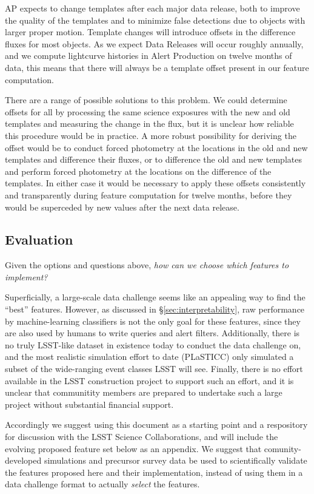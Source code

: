 \documentclass[DM,authoryear,toc]{lsstdoc}
\begin{document}
AP expects to change templates after each major data release, both to improve the quality of the templates and to minimize false detections due to objects with larger proper motion.
Template changes will introduce offsets in the difference fluxes for most objects.
As we expect Data Releases will occur roughly annually, and we compute lightcurve histories in Alert Production on twelve months of data, this means that there will always be a template offset present in our feature computation.

There are a range of possible solutions to this problem. 
We could determine offsets for all \DIAObjects by processing the same science exposures with the new and old templates and measuring the change in the \DIASource flux, but it is unclear how reliable this procedure would be in practice.
A more robust possibility for deriving the offset would be to conduct forced photometry at the \DIAObject locations in the old and new templates and difference their fluxes, or to difference the old and new templates and perform forced photometry at the \DIAObject locations on the difference of the templates.
In either case it would be necessary to apply these offsets consistently and transparently during feature computation for twelve months, before they would be superceded by new values after the next data release.  


\subsection{Evaluation}

Given the options and questions above, 
\textit{how can we choose which features to implement?}

Superficially, a large-scale data challenge seems like an appealing way to find the ``best'' features.
However, as discussed in \S \ref{sec:interpretability}, raw performance by machine-learning classifiers is not the only goal for these features, since they are also used by humans to write queries and alert filters.
Additionally, there is no truly LSST-like dataset in existence today to conduct the data challenge on, and the most realistic simulation effort to date (PLaSTICC) only simulated a subset of the wide-ranging event classes LSST will see.
Finally, there is no effort available in the LSST construction project to support such an effort, and it is unclear that communitity members are prepared to undertake such a large project without substantial financial support.

Accordingly we suggest using this document as a starting point and a respository for discussion with the LSST Science Collaborations, and will include the evolving proposed feature set below as an appendix.
We suggest that comunity-developed simulations and precursor survey data be used to scientifically validate the features proposed here and their implementation, instead of using them in a data challenge format to actually \textit{select} the features. 
\end{document}
